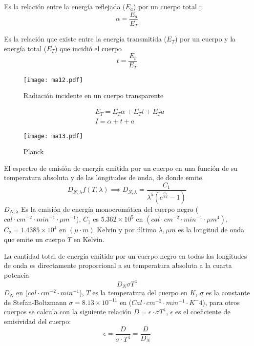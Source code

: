\begin{definition}
    Es la relación entre la energía reflejada ($E_a$) por un cuerpo total :
    \begin{equation}
        \alpha =\frac{E_a}{E_T}
    \end{equation}
\end{definition}
\begin{definition}[Transmisión ($t$)]
    Es la relación que existe entre la energía transmitida ($E_T$) por un cuerpo y la energía total ($E_T$) que incidió el cuerpo
    \begin{equation}
        t =\frac{E_t}{E_T}
    \end{equation}
\end{definition}
\begin{figure}[h!]
\centering
  \texttt{[image: ma12.pdf]}
  \caption{Radiación incidente en un cuerpo transparente}
  \label{ma12}
\end{figure}
\begin{align}
    &E_T =E_T\alpha + E_Tt+ E_Ta\\
    &I = \alpha + t + a
\end{align}
\begin{figure}[h!]
\centering
  \texttt{[image: ma13.pdf]}
  \caption{Planck}
  \label{ma13}
\end{figure}
El espectro de emisión de energía emitida por un cuerpo en una función de su temperatura absoluta y de las longitudes de onda, de donde emite.
\begin{equation}
    D_{N,\lambda} f\left(T,\lambda\right)\implies D_{N,\lambda} = \frac{C_1}{\lambda^5\left(e^{\frac{C_2}{\lambda T}} - 1\right)}
\end{equation}
$D_{N,\lambda}$ Es la emisión de energía monocromática del cuerpo negro ($cal\cdot cm^{-2}\cdot min^{-1}\cdot \mu m^{-1}$), $C_1$ es $5.362\times 10^5$ en $(cal\cdot cm^{-2}\cdot min^{-1}\cdot \mu m^4)$, $C_2=1.4385\times 10^4$ en $(\mu\cdot m)$ Kelvin y por último $\lambda, \mu m$ es la longitud de onda que emite un cuerpo $T$ en Kelvin.
\begin{definition}
    La cantidad total de energía emitida por un cuerpo negro en todas las longitudes de onda es directamente proporcional a su temperatura absoluta a la cuarta potencia
    \begin{equation}
        D_N \sigma T^4
    \end{equation}
    $D_N$ en ($cal\cdot cm^{-2}\cdot min^{-1}$), $T$ es la temperatura del cuerpo en $K$, $\sigma$ es la constante de Stefan-Boltzmann $\sigma=8.13\times 10^{-11}$ en ($Cal\cdot cm^{-2}\cdot min^{-1}\cdot K^-4$), para otros cuerpos se calcula con la siguiente relación $D=\epsilon\cdot \sigma T^4$, $\epsilon$ es el coeficiente de emisividad del cuerpo:
    \begin{equation}
        \epsilon = \frac{D}{\sigma\cdot T^4}= \frac{D}{D_N}
    \end{equation}
\end{definition}
